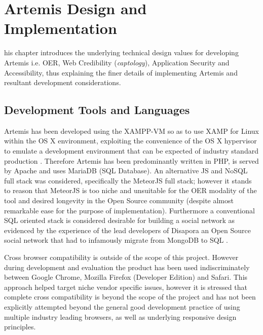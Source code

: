 %
%
\let\textcircled=\pgftextcircled
\chapter{Artemis Design and Implementation}
\label{Artemis Design and Implementation}

his chapter introduces the underlying technical design values for developing Artemis i.e. OER, Web Credibility (\textit{captology}), Application Security and Accessibility, thus explaining the finer details of implementing Artemis and resultant development considerations.


\section{Development Tools and Languages}

Artemis has been developed using the XAMPP-VM so as to use XAMP for Linux within the OS X environment, exploiting the convenience of the OS X hypervisor to emulate a development environment that can be expected of industry standard production \cite{ApacheFriends.org}. Therefore Artemis has been predominantly written in PHP, is served by Apache and uses MariaDB (SQL Database). An alternative  JS and NoSQL full stack was considered, specifically the MeteorJS full stack; however it stands to reason that MeteorJS is too niche and unsuitable for the OER modality of the tool and desired longevity in the Open Source community (despite almost remarkable ease for the purpose of implementation). Furthermore a conventional SQL oriented stack is considered desirable for building a social network as evidenced by the experience of the lead developers of Disapora an Open Source social network that had to infamously migrate from MongoDB to SQL \cite{Mei}.

Cross browser compatibility is outside of the scope of this project. However during development and evaluation the product has been used indiscriminately between Google Chrome, Mozilla Firefox (Developer Edition) and Safari. This approach helped target niche vendor specific issues, however it is stressed that complete cross compatibility is beyond the scope of the project and has not been explicitly attempted beyond the general good development practice of using multiple industry leading browsers, as well as underlying responsive design principles.







